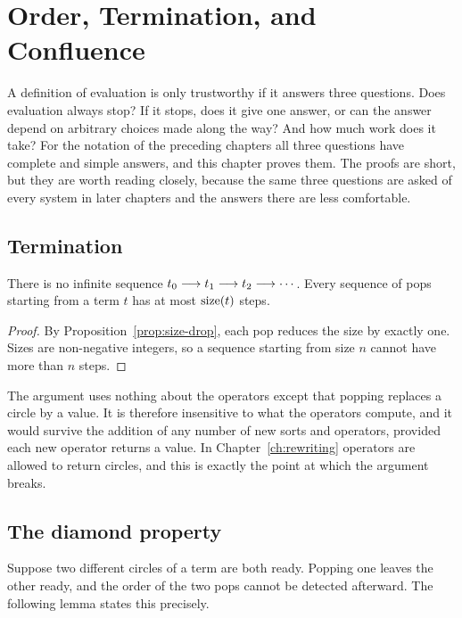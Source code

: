 \chapter{Order, Termination, and Confluence}
\label{ch:order}

A definition of evaluation is only trustworthy if it answers three questions. Does evaluation always stop? If it stops, does it give one answer, or can the answer depend on arbitrary choices made along the way? And how much work does it take? For the notation of the preceding chapters all three questions have complete and simple answers, and this chapter proves them. The proofs are short, but they are worth reading closely, because the same three questions are asked of every system in later chapters and the answers there are less comfortable.

\section{Termination}

\begin{theorem}[Termination]\label{thm:termination}
There is no infinite sequence $t_0\longrightarrow t_1\longrightarrow t_2\longrightarrow\cdots$. Every sequence of pops starting from a term $t$ has at most $\operatorname{size}(t)$ steps.
\end{theorem}
\begin{proof}
By Proposition~\ref{prop:size-drop}, each pop reduces the size by exactly one. Sizes are non-negative integers, so a sequence starting from size $n$ cannot have more than $n$ steps.
\end{proof}

The argument uses nothing about the operators except that popping replaces a circle by a value. It is therefore insensitive to what the operators compute, and it would survive the addition of any number of new sorts and operators, provided each new operator returns a value. In Chapter~\ref{ch:rewriting} operators are allowed to return circles, and this is exactly the point at which the argument breaks.

\section{The diamond property}

Suppose two different circles of a term are both ready. Popping one leaves the other ready, and the order of the two pops cannot be detected afterward. The following lemma states this precisely.

